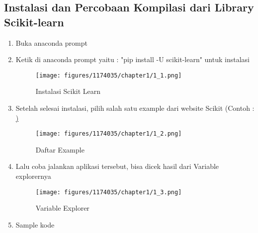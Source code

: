 \subsection{Instalasi dan Percobaan Kompilasi dari Library Scikit-learn}
\begin{enumerate}
	\item Buka anaconda prompt
	\item Ketik di anaconda prompt yaitu : "pip install -U scikit-learn" untuk instalasi \hfill \break
	\begin{figure}[H]
		\texttt{[image: figures/1174035/chapter1/1\_1.png]}
		\centering
		\caption{Instalasi Scikit Learn}
	\end{figure}
	\item Setelah selesai instalasi, pilih salah satu example dari website Scikit (Contoh : \href{https://scikit-learn.org/stable/auto_examples/index.html})
	\begin{figure}[H]
		\texttt{[image: figures/1174035/chapter1/1\_2.png]}
		\centering
		\caption{Daftar Example}
	\end{figure}
	\item Lalu coba jalankan aplikasi tersebut, bisa dicek hasil dari Variable explorernya
	\begin{figure}[H]
		\texttt{[image: figures/1174035/chapter1/1\_3.png]}
		\centering
		\caption{Variable Explorer}
	\end{figure}
	\item Sample kode \hfill \break 
\end{enumerate}

